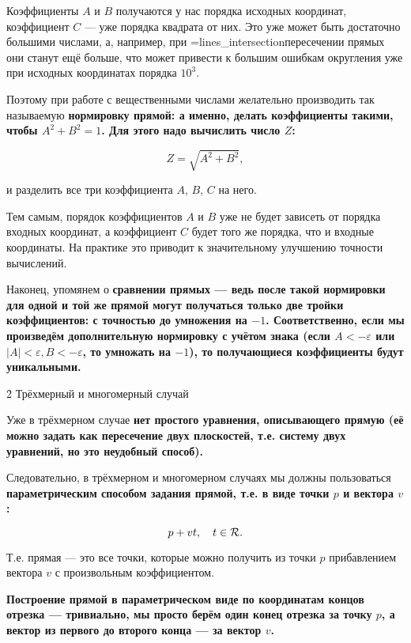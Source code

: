 Коэффициенты $A$ и $B$ получаются у нас порядка исходных координат, коэффициент $C$ --- уже порядка квадрата от них. Это уже может быть достаточно большими числами, а, например, при \algohref=lines_intersection{пересечении прямых} они станут ещё больше, что может привести к большим ошибкам округления уже при исходных координатах порядка $10^3$.

Поэтому при работе с вещественными числами желательно производить так называемую \bf{нормировку} прямой: а именно, делать коэффициенты такими, чтобы $A^2 + B^2 = 1$. Для этого надо вычислить число $Z$:

$$ Z = \sqrt{ A^2 + B^2 }, $$

и разделить все три коэффициента $A$, $B$, $C$ на него.

Тем самым, порядок коэффициентов $A$ и $B$ уже не будет зависеть от порядка входных координат, а коэффициент $C$ будет того же порядка, что и входные координаты. На практике это приводит к значительному улучшению точности вычислений.

Наконец, упомянем о \bf{сравнении} прямых --- ведь после такой нормировки для одной и той же прямой могут получаться только две тройки коэффициентов: с точностью до умножения на $-1$. Соответственно, если мы произведём дополнительную нормировку с учётом знака (если $A<-\varepsilon$ или $|A|<\varepsilon, B<-\varepsilon$, то умножать на $-1$), то получающиеся коэффициенты будут уникальными.


\h2{ Трёхмерный и многомерный случай }

Уже в трёхмерном случае \bf{нет простого уравнения}, описывающего прямую (её можно задать как пересечение двух плоскостей, т.е. систему двух уравнений, но это неудобный способ).

Следовательно, в трёхмерном и многомерном случаях мы должны пользоваться \bf{параметрическим способом задания прямой}, т.е. в виде точки $p$ и вектора $v$:

$$ p + v t, ~~~ t \in \cal{R}. $$

Т.е. прямая --- это все точки, которые можно получить из точки $p$ прибавлением вектора $v$ с произвольным коэффициентом.

\bf{Построение} прямой в параметрическом виде по координатам концов отрезка --- тривиально, мы просто берём один конец отрезка за точку $p$, а вектор из первого до второго конца --- за вектор $v$.
